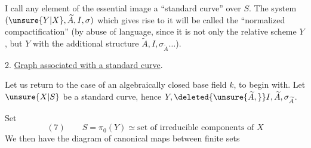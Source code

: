 I call any element of the essential image a ``standard  curve'' over $S$. The system $(\unsure{Y|X},\widetilde A,I,\sigma)$ which gives rise to it will be called the ``normalized compactification''  (by abuse of  language, since it is not only the relative scheme $Y$, but $Y$ with the additional structure $\widetilde A,I,\sigma_{\widetilde A}\ldots$).

2. \uline{Graph associated with a standard curve}.

Let us return to the case of an algebraically closed base field $k$, to begin with. Let $\unsure{X|S}$ be a standard curve, hence $Y,\deleted{\unsure{\widetilde A,}}I,\widetilde A,\sigma_{\widetilde A}$.

Set
\[
(7)\qquad S=\pi_0(Y)\simeq\text{set of irreducible components of }X
\]
We then have the diagram of canonical maps between finite sets
